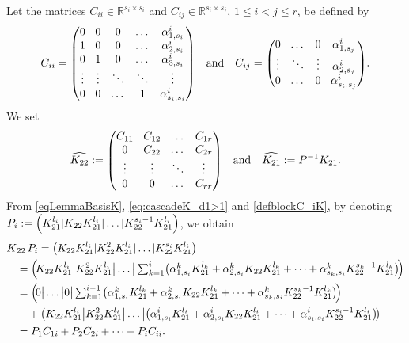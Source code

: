 \documentclass[JEP,XML,SOM,Unicode,NoEqCountersInSection]{cedram}
\let\ts\textstyle
\theoremstyle{plain}
\theoremstyle{definition}
\theoremstyle{remark}
\newcommand{\set}{\mathbb}
\newcommand{\R}{} %
\renewcommand{\R}{\set{R}}
\newcommand{\coloneqq}{\mathrel{\mathord{:}\mathord=}}
\let\originalleft\left
\let\originalright\right
\renewcommand{\left}{\mathopen{}\mathclose\bgroup\originalleft}
\renewcommand{\right}{\aftergroup\egroup\originalright}
\begin{document}
Let the matrices $C_{ii} \in \R^{s_i \times s_i}$ and $C_{ij} \in \R^{s_i \times s_j}$, $1 \leq i < j \leq r$, be defined by
\begin{equation}\arraycolsep4.5pt
C_{ii} = \begin{pmatrix} 0 & 0 & 0 & \dots & \alpha_{1, s_i}^i\\
1 & 0 & 0 & \dots & \alpha_{2, s_i}^i\\
0 & 1 & 0 & \dots & \alpha_{3, s_i}^i \\
\vdots & \vdots & \ddots & \ddots & \vdots\\
0 & 0 & \dots & 1 & \alpha_{s_i,s_i}^i
\end{pmatrix}\quad \text{and}\quad
C_{ij} = \begin{pmatrix} 0 & \dots & 0 & \alpha_{1, s_j}^i\\
\vdots & \ddots & \vdots & \alpha_{2, s_j}^i\\
0 & \dots & 0 & \alpha_{s_i,s_j}^i
\end{pmatrix}.
\label{defblockC_iK}
\end{equation}
We set
\begin{equation}
\label{eq:cascadeK_d1>1}\arraycolsep4.5pt
\widehat{K_{22}}\coloneqq \begin{pmatrix} C_{11} & C_{12} & \dots & C_{1r}\\
0 & C_{22} &\dots &C_{2r}\\
\vdots & \vdots & \ddots & \vdots \\
0 & 0 &\dots & C_{rr}\\
\end{pmatrix}\quad \text{and}\quad
\widehat{K_{21}}\coloneqq P^{-1} K_{21}.
\end{equation}
From \eqref{eqLemmaBasisK}, \eqref{eq:cascadeK_d1>1} and \eqref{defblockC_iK}, by denoting $P_ i \coloneqq \left(K_{21}^{l_i} | K_{22} K_{21}^{l_i} | \dots | K_{22}^{s_i-1} K_{21}^{l_i}\right)$, we obtain
\begin{align*}
K&_{22}\, P_i = \bigl(K_{22}K_{21}^{l_i} | K_{22}^2 K_{21}^{l_i} | \dots | K_{22}^{s_i} K_{21}^{l_i}\bigr)\\
&= \Bigl(\!K_{22}K_{21}^{l_i} \big| K_{22}^2 K_{21}^{l_i} \big| \dots \big| \ts\sum_{k=1}^i \bigl(\alpha_{1, s_i}^k K_{21}^{l_k} + \alpha_{2, s_i}^k K_{22} K_{21}^{l_k} + \dots + \alpha_{s_k,s_i}^k K_{22}^{s_k-1} K_{21}^{l_k}\bigr)\! \Bigr)\\
&= \Bigl(\!0 \big| \dots \big| 0 \big| \ts\sum_{k=1}^{i-1} \bigl(\alpha_{1, s_i}^k K_{21}^{l_k} + \alpha_{2, s_i}^k K_{22} K_{21}^{l_k} + \dots + \alpha_{s_k,s_i}^k K_{22}^{s_k-1} K_{21}^{l_k}\bigr)\! \Bigr)\\
&\quad + \bigl(K_{22}K_{21}^{l_i} \big| K_{22}^2 K_{21}^{l_i} \big| \dots \big| \bigl(\alpha_{1, s_i}^i K_{21}^{l_i} + \alpha_{2, s_i}^i K_{22} K_{21}^{l_i} + \dots + \alpha_{s_i,s_i}^i K_{22}^{s_i-1} K_{21}^{l_i}\bigr)\! \bigr) \\
&= P_1 C_{1i} + P_{2} C_{2i} + \dots + P_{i} C_{ii}.
\end{align*}
\end{document}
